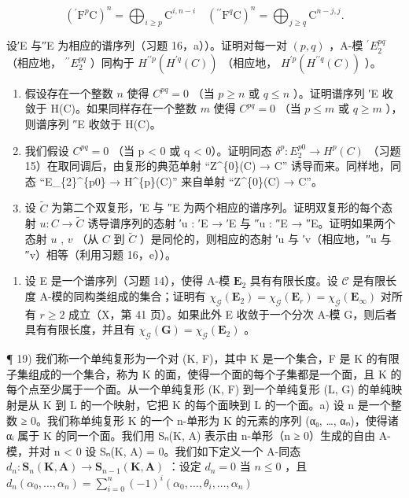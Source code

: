 \[
\left(^ {\prime} \mathrm{F} ^ {p} \mathrm{C}\right) ^ {n} = \bigoplus_ {i \geqslant p} \mathrm{C} ^ {i, n - i} \quad \left(^ {\prime \prime} \mathrm{F} ^ {q} \mathrm{C}\right) ^ {n} = \bigoplus_ {j \geqslant q} \mathrm{C} ^ {n - j, j}.
\]

设′E 与″E 为相应的谱序列（习题 16，a））。证明对每一对 \((p, q)\) ，A-模 \({}^{\prime}E_2^{pq}\) （相应地， \({}^{\prime\prime}E_2^{pq}\) ）同构于 \(H^{\prime\prime p}(H^{\prime q}(C))\) （相应地， \(H^{\prime p}(H^{\prime\prime q}(C))\) ）。

\begin{enumerate}
\def\labelenumi{\alph{enumi})}
\setcounter{enumi}{1}
\item
  假设存在一个整数 \(n\) 使得 \(C^{pq} = 0\) （当 \(p \geqslant n\) 或 \(q \leqslant n\) ）。证明谱序列 ′E 收敛于 H(C)。如果同样存在一个整数 \(m\) 使得 \(C^{pq} = 0\) （当 \(p \leqslant m\) 或 \(q \geqslant m\) ），则谱序列 ″E 收敛于 H(C)。
\item
  我们假设 \(C^{pq} = 0\) （当 p \textless{} 0 或 q \textless{} 0）。证明同态 \(\delta^{p}: E_{2}^{p0} \to H^{p}(C)\) （习题 15）在取同调后，由复形的典范单射 ``Z\^{}\{0\}(C) → C'' 诱导而来。同样地，同态 ``E\_\{2\}\^{}\{p0\} → H\^{}\{p\}(C)'' 来自单射 ``Z\^{}\{0\}(C) → C''。
\item
  设 \(\tilde{C}\) 为第二个双复形，′E 与 ″E 为两个相应的谱序列。证明双复形的每个态射 \(u: C \to \tilde{C}\) 诱导谱序列的态射 ′u : ′E → ′E 与 ″u : ″E → ″E。证明如果两个态射 \(u\) , \(v\) （从 \(C\) 到 \(\tilde{C}\) ）是同伦的，则相应的态射 ′u 与 ′v（相应地，″u 与 ″v）相等（利用习题 16，e））。
\end{enumerate}

\begin{enumerate}
\def\labelenumi{\arabic{enumi})}
\setcounter{enumi}{17}
\tightlist
\item
  设 E 是一个谱序列（习题 14），使得 A-模 \(\mathbf{E}_2\) 具有有限长度。设 \(\mathcal{C}\) 是有限长度 A-模的同构类组成的集合；证明有 \(\chi_{\mathcal{G}}(\mathbf{E}_2) = \chi_{\mathcal{G}}(\mathbf{E}_r) = \chi_{\mathcal{G}}(\mathbf{E}_{\infty})\) 对所有 \(r \geqslant 2\) 成立（X，第 41 页）。如果此外 E 收敛于一个分次 A-模 G，则后者具有有限长度，并且有 \(\chi_{\mathcal{G}}(\mathbf{G}) = \chi_{\mathcal{G}}(\mathbf{E}_2)\) 。
\end{enumerate}

¶ 19) 我们称一个单纯复形为一个对 (K, F)，其中 K 是一个集合，F 是 K 的有限子集组成的一个集合，称为 K 的面，使得一个面的每个子集都是一个面，且 K 的每个点至少属于一个面。从一个单纯复形 (K, F) 到一个单纯复形 (L, G) 的单纯映射是从 K 到 L 的一个映射，它把 K 的每个面映到 L 的一个面。a) 设 n 是一个整数 ≥ 0。我们称单纯复形 K 的一个 n-单形为 K 的元素的序列 (α₀, \ldots, αₙ)，使得诸 αᵢ 属于 K 的同一个面。我们用 Sₙ(K, A) 表示由 n-单形（n ≥ 0）生成的自由 A-模，并对 n \textless{} 0 设 Sₙ(K, A) = 0。我们如下定义一个 A-同态 \(d_{n}:\mathbf{S}_{n}(\mathbf{K},\mathbf{A})\to \mathbf{S}_{n - 1}(\mathbf{K},\mathbf{A})\) ：设定 \(d_{n} = 0\) 当 \(n\leqslant 0\) ，且 \(d_{n}(\alpha_{0},\dots,\alpha_{n}) = \sum_{i = 0}^{n}(-1)^{i}(\alpha_{0},\dots,\theta_{i},\dots,\alpha_{n})\)

